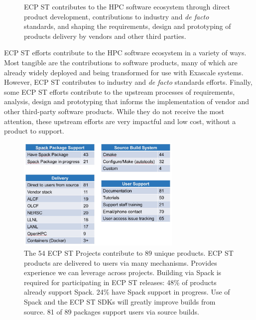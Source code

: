 \begin{figure}
	\begin{mdframed}
		\large{ECP ST contributes to the HPC software ecosystem through direct product development, contributions to industry and \textit{de facto} standards, and shaping the requirements, design and prototyping of products delivery by vendors and other third parties.}
	\end{mdframed}
\end{figure}
ECP ST efforts contribute to the HPC software ecosystem in a variety of ways.  Most tangible are the contributions to software products, many of which are already widely deployed and being transformed for use with Exascale systems.  However, ECP ST contributes to industry and \textit{de facto} standards efforts.  Finally, some ECP ST efforts contribute to the upstream processes of requirements, analysis, design and prototyping that informs the implementation of vendor and other third-party software products.  While they do not receive the most attention, these upstream efforts are very impactful and low cost, without a product to support.

\begin{figure}[htb]
	\begin{center}
		\includegraphics[width=0.7\textwidth]{ProductsOverview}

		\caption{\label{fig:productsoverview}{\small{The 54 ECP ST Projects contribute to 89 unique products.   ECP ST products are delivered to users via many mechanisms. Provides experience we can leverage across projects.  Building via Spack is required for participating in ECP ST releases: 48\% of products already support Spack.   24\% have Spack support in progress.  Use of Spack and the ECP ST SDKs will greatly improve builds from source. 81 of 89 packages support users via source builds.}}}
	\end{center}
\end{figure}
